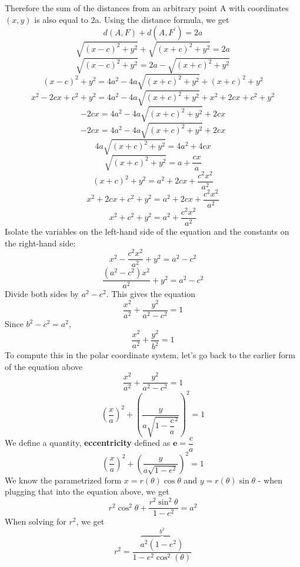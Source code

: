 \documentclass[12pt,addpoints]{exam}
\begin{document}
	Therefore the sum of the distances from an arbitrary point A with coordinates $(x,y)$ is also equal to 2a. Using the distance formula, we get
	$$d(A,F)+d(A,F^{\prime})=2a$$
	$$\sqrt{(x-c)^2+y^2}+\sqrt{(x+c)^2+y^2}=2a$$	
	$$\sqrt{(x-c)^2+y^2}=2a-\sqrt{(x+c)^2+y^2}$$
	$$(x-c)^2+y^2=4a^2-4a\sqrt{(x+c)^2+y^2}+(x+c)^2+y^2$$
	$$x^2-2cx+c^2+y^2=4a^2-4a\sqrt{(x+c)^2+y^2}+x^2+2cx+c^2+y^2$$
	$$-2cx=4a^2-4a\sqrt{(x+c)^2+y^2}+2cx$$
	$$-2cx=4a^2-4a\sqrt{(x+c)^2+y^2}+2cx$$
	$$4a\sqrt{(x+c)^2+y^2}=4a^2+4cx$$
	$$\sqrt{(x+c)^2+y^2}=a+\dfrac{cx}{a}$$
	$$(x+c)^2+y^2=a^2+2cx+\dfrac{c^2x^2}{a^2}$$
	$$x^2+2cx+c^2+y^2=a^2+2cx+\dfrac{c^2x^2}{a^2}$$
	$$x^2+c^2+y^2=a^2+\dfrac{c^2x^2}{a^2}$$
	Isolate the variables on the left-hand side of the equation and the constants on the right-hand side:
	$$x^2-\dfrac{c^2x^2}{a^2}+y^2=a^2-c^2$$
	$$\dfrac{(a^2-c^2)x^2}{a^2}+y^2=a^2-c^2$$
	Divide both sides by $a^2-c^2$. This gives the equation
	$$\dfrac{x^2}{a^2}+\dfrac{y^2}{a^2-c^2}=1$$
	Since $b^2-c^2=a^2$,
	$$\dfrac{x^2}{a^2}+\dfrac{y^2}{b^2}=1$$
	To compute this in the polar coordinate system, let's go back to the earlier form of the equation above
	$$\dfrac{x^2}{a^2}+\dfrac{y^2}{a^2-c^2}=1$$
	$$\left(\frac{x}{a}\right)^2+\left(\frac{y}{a\sqrt{1-\dfrac{c}{a}^2}}\right)^2=1$$
	We define a quantity, \textbf{eccentricity} defined as $\textbf{e}=\dfrac{c}{a}$
	$$\left(\frac{x}{a}\right)^2+\left(\frac{y}{a\sqrt{1-e^2}}\right)^2=1$$
	We know the parametrized form  $x=r(\theta)\cos\theta$ and  $y=r(\theta)\sin\theta$ - when plugging that into the equation above, we get
	$$r^2\cos^2\theta+\frac{r^2\sin^2\theta}{1-e^2}=a^2$$
	When solving for $r^2$, we get
	$$r^2=\frac{\overbrace{a^2\!\left(1-e^2\right)}^{b^2}}{1-e^2\cos^2(\theta)}$$
	
\end{document}

